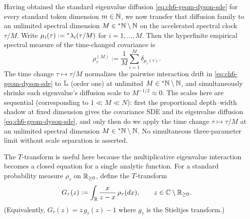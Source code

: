 Having obtained the standard eigenvalue diffusion \eqref{eq:ch6-geom-dyson-sde} for every standard token dimension $m \in \mathbb{N}$, we now transfer that diffusion family to an unlimited spectral dimension $M \in {}^*\mathbb{N} \setminus \mathbb{N}$ on the accelerated spectral clock $\tau / M$. Write $\mu_i(\tau) := {}^*\lambda_i(\tau / M)$ for $i = 1, \dots, M$. Then the hyperfinite empirical spectral measure of the time-changed covariance is
\begin{equation}
\label{eq:ch6-emp-spec-meas}
\rho_\tau^{(M)} := \frac{1}{M}\sum_{i=1}^M \delta_{\mu_i(\tau)}.
\end{equation}
The time change $\tau \mapsto \tau / M$ normalizes the pairwise interaction drift in \eqref{eq:ch6-geom-dyson-sde} to $\mathbb{L}$ (order one) at unlimited $M \in {}^*\mathbb{N} \setminus \mathbb{N}$, and simultaneously shrinks each eigenvalue's diffusion scale to $M^{-1/2} \approx 0$. The scales here are sequential (corresponding to $1 \ll M \ll N$): first the proportional depth--width shadow at fixed dimension gives the covariance SDE and its eigenvalue diffusion \eqref{eq:ch6-geom-dyson-sde}, and only then do we apply the time change $\tau \mapsto \tau/M$ at an unlimited spectral dimension $M \in {}^*\mathbb{N} \setminus \mathbb{N}$. No simultaneous three-parameter limit without scale separation is asserted.

The $T$-transform is useful here because the multiplicative eigenvalue interaction becomes a closed equation for a single analytic function. For a standard probability measure $\rho_\tau$ on $\mathbb{R}_{\ge 0}$, define the $T$-transform
\begin{equation}
\label{eq:ch6-T-transform}
G_\tau(z) := \int_{\mathbb{R}} \frac{x}{z - x}\,\rho_\tau(dx), \qquad z \in \mathbb{C} \setminus \mathbb{R}_{\ge 0}.
\end{equation}
(Equivalently, $G_\tau(z) = z\,g_\tau(z) - 1$ where $g_\tau$ is the Stieltjes transform.)

